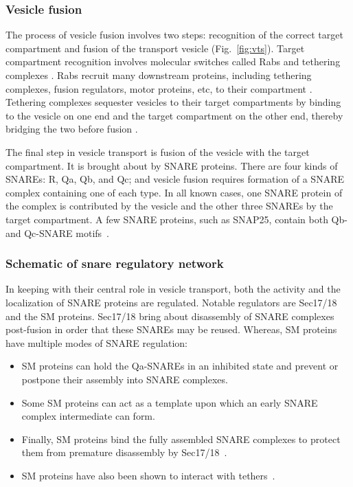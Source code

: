 \subsubsection{Vesicle fusion} 
The process of vesicle fusion involves two steps: recognition of the correct target compartment and fusion of the transport vesicle (Fig.~\ref{fig:vts}). 
%
Target compartment recognition involves molecular
switches called Rabs and tethering complexes \cite{rink2005rab}. 
%
Rabs recruit many downstream proteins, including tethering complexes, fusion regulators, motor proteins, etc, to their compartment \cite{muller2018molecular}. 
%
Tethering complexes sequester vesicles to their target compartments by binding to the vesicle on one end and the target compartment on the other end, thereby bridging the two
before fusion \cite{baker2016chaperoning}.

%
The final step in vesicle transport is fusion of the vesicle with the target compartment. 
%
It is brought about by SNARE proteins.
%
There are four kinds of SNAREs: R, Qa, Qb, and Qc; and vesicle fusion requires formation of a SNARE complex containing one of each type. 
%
In all known cases, one SNARE protein of the complex is contributed by the vesicle and the other three SNAREs by the target compartment. 
%
A few SNARE proteins, such as SNAP25, contain both Qb- and Qc-SNARE motifs~\cite{yoon2018snare}.

\subsubsection{Schematic of snare regulatory network}
In keeping with their central role in vesicle transport, both the activity and the localization of SNARE proteins are regulated. Notable regulators are Sec17/18 and the SM proteins.
%
Sec17/18 bring about disassembly of SNARE complexes post-fusion in order that these SNAREs may be reused. 
%
Whereas, SM proteins have multiple modes of SNARE regulation: 
\begin{itemize}
	\item SM proteins can hold
	the Qa-SNAREs in an inhibited state and prevent or postpone their assembly into SNARE
	complexes.
	\item Some SM proteins can act as a template upon which an early SNARE complex intermediate can form.
	\item Finally, SM proteins bind the fully assembled
	SNARE complexes to protect them from premature disassembly by Sec17/18~\cite{baker2016chaperoning}.
	\item SM proteins have also been shown to interact with tethers~\cite{yoon2018snare}.
\end{itemize}

